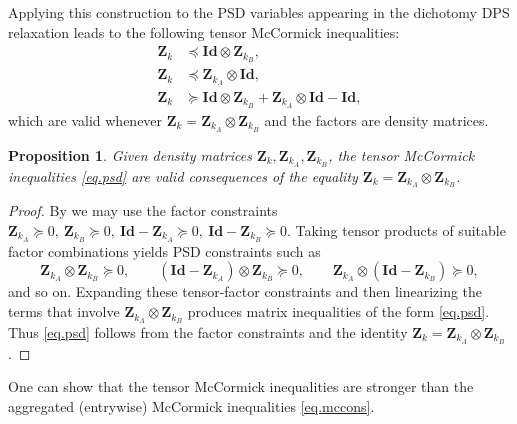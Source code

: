 \documentclass[smallextended]{svjour3}
\newtheorem{proposition}{Proposition}
\newcommand{\Z}{\mathbf{Z}}
\newcommand{\1}{\mathbf{1}}
\newcommand{\Id}{\mathbf{Id}}
\DeclareMathOperator{\mtens}{\otimes}
\begin{document}
Applying this construction to the PSD variables appearing in the dichotomy DPS relaxation leads to the following tensor McCormick inequalities:
\begin{subequations}
\label{eq.psd}
\begin{align}
    \Z_{k} &\preceq  \Id \mtens \Z_{k_B}, \\
     \Z_{k} &\preceq \Z_{k_A} \mtens \Id, \\
     \Z_{k} &\succeq \Id \mtens \Z_{k_B} + \Z_{k_A} \mtens \Id - \Id,
\end{align}
\end{subequations}
which are valid whenever $\Z_k=\Z_{k_A}\mtens\Z_{k_B}$ and the factors are density matrices.

\begin{proposition}
Given density matrices $\Z_k, \Z_{k_A}, \Z_{k_B}$, the tensor McCormick inequalities \eqref{eq.psd} are valid consequences of the equality $\Z_k=\Z_{k_A}\mtens\Z_{k_B}$.
\end{proposition}
\begin{proof}
By  we may use the factor constraints
$\Z_{k_A}\succeq0,\ \Z_{k_B}\succeq0,\ \Id-\Z_{k_A}\succeq0,\ \Id-\Z_{k_B}\succeq0$.
Taking tensor products of suitable factor combinations yields PSD constraints such as
\[
\Z_{k_A}\mtens\Z_{k_B}\succeq0,\qquad
(\Id-\Z_{k_A})\mtens\Z_{k_B}\succeq0,\qquad
\Z_{k_A}\mtens(\Id-\Z_{k_B})\succeq0,
\]
and so on. Expanding these tensor-factor constraints and then linearizing the terms that involve $\Z_{k_A}\mtens\Z_{k_B}$ produces matrix inequalities of the form \eqref{eq.psd}. Thus \eqref{eq.psd} follows from the factor constraints and the identity $\Z_k=\Z_{k_A}\mtens\Z_{k_B}$.
\end{proof}

 One can show that the tensor McCormick inequalities are stronger than the aggregated (entrywise) McCormick inequalities \eqref{eq.mccons}.
\end{document}
